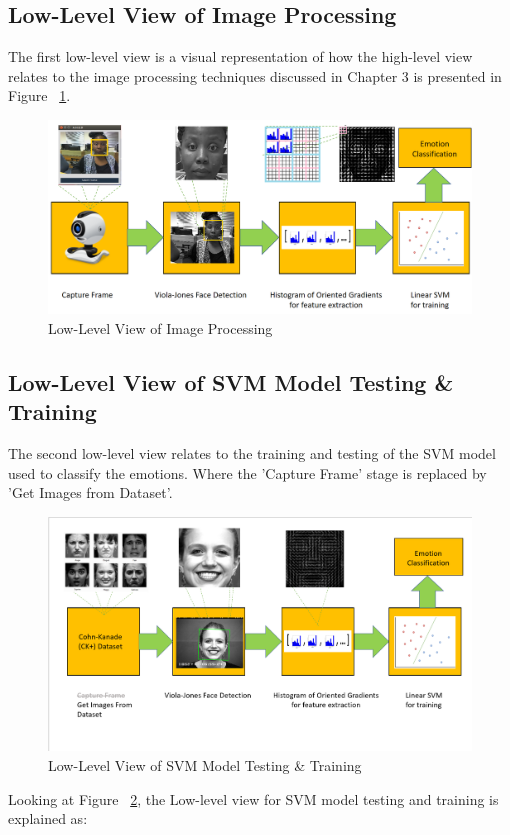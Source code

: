 \subsection{Low-Level View of Image Processing}

The first low-level view is a visual representation of how the high-level view relates to the image processing techniques discussed in Chapter 3 is presented in Figure ~\ref{fig: lowlevel}. 
\begin{figure}[H]
  \centering
  \includegraphics[scale=0.2]{pres2}
  \caption{Low-Level View of Image Processing}
  \label{fig: lowlevel}
\end{figure} 

\subsection{Low-Level View of SVM Model Testing \& Training}

The second low-level view relates to the training and testing of the SVM model used to classify the emotions. Where the 'Capture Frame' stage is replaced by 'Get Images from Dataset'.
\begin{figure}[H]
  \centering
  \includegraphics[scale=0.6]{second}
  \caption{Low-Level View of SVM Model Testing \& Training}
  \label{fig: lowlevel2}
\end{figure} 
Looking at Figure ~\ref{fig: lowlevel2}, the Low-level view for SVM model testing and training is explained as:

